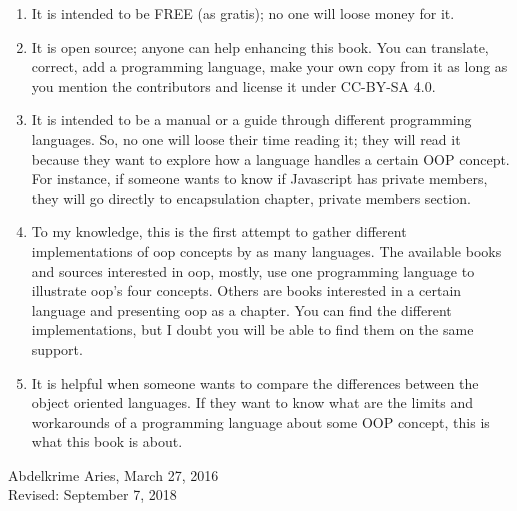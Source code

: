 \documentclass[12pt]{book}
\begin{document}
\begin{enumerate}
	
\item It is intended to be FREE (as gratis); no one will loose money for it. 

\item It is open source; anyone can help enhancing this book.
You can translate, correct, add a programming language, make your own copy from it as long as you mention the contributors and license it under CC-BY-SA 4.0.

\item It is intended to be a manual or a guide through different programming languages. 
So, no one will loose their time reading it; they will read it because they want to explore how a language handles a certain OOP concept. 
For instance, if someone wants to know if Javascript has private members, they will go directly to encapsulation chapter, private members section. 

\item To my knowledge, this is the first attempt to gather different implementations of \ac{oop} concepts by as many languages.
The available books and sources interested in \ac{oop}, mostly, use one programming language to illustrate \ac{oop}'s four concepts.
Others are books interested in a certain language and presenting \ac{oop} as a chapter. 
You can find the different implementations, but I doubt you will be able to find them on the same support.

\item It is helpful when someone wants to compare the differences between the object oriented languages.
If they want to know what are the limits and workarounds of a programming language about some OOP concept, this is what this book is about.


\end{enumerate}
\vfill
\begin{flushright}
Abdelkrime Aries, March 27, 2016 \\
Revised: September 7, 2018
\end{flushright}

\ifx\wholebook\relax\else
% 
% 
	
\end{document}
